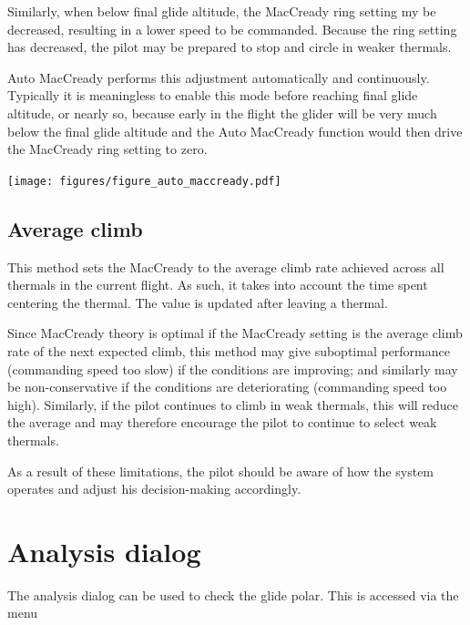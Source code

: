Similarly, when below final glide altitude, the MacCready ring setting
my be decreased, resulting in a lower speed to be commanded.  Because
the ring setting has decreased, the pilot may be prepared to stop and
circle in weaker thermals.

Auto MacCready performs this adjustment automatically and
continuously.  Typically it is meaningless to enable this mode before
reaching final glide altitude, or nearly so, because early in the
flight the glider will be very much below the final glide altitude and
the Auto MacCready function would then drive the MacCready ring
setting to zero.

\begin{maxipage}
\begin{center}
\texttt{[image: figures/figure\_auto\_maccready.pdf]}
\end{center}
\end{maxipage}

\subsection*{Average climb}

This method sets the MacCready to the average climb rate achieved
across all thermals in the current flight.  As such, it takes into
account the time spent centering the thermal.  The value is updated
after leaving a thermal.

Since MacCready theory is optimal if the MacCready setting is the
average climb rate of the next expected climb, this method may give
suboptimal performance (commanding speed too slow) if the conditions
are improving; and similarly may be non-conservative if the conditions
are deteriorating (commanding speed too high).  Similarly, if the pilot
continues to climb in weak thermals, this will reduce the average
and may therefore encourage the pilot to continue to select weak thermals.

As a result of these limitations, the pilot should be aware of how the
system operates and adjust his decision-making accordingly.

\section{Analysis dialog}

The analysis dialog can be used to check the glide polar.  This is
accessed via the menu 
\begin{quote}
\blink{}
\end{quote}


